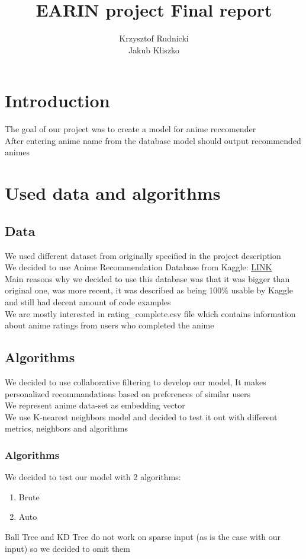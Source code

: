 \documentclass[12pt]{article}
\title{EARIN project Final report}
\author{Krzysztof Rudnicki \\ Jakub Kliszko}
\begin{document}
\maketitle
\section{Introduction}
The goal of our project was to create a model for anime reccomender \\ 
After entering anime name from the database model should output recommended animes 
\section{Used data and algorithms}
\subsection{Data}
We used different dataset from originally specified in the project description \\ 
We decided to use Anime Recommendation Database from Kaggle: \href{https://www.kaggle.com/datasets/hernan4444/anime-recommendation-database-2020}{LINK} \\ 
Main reasons why we decided to use this database was that it was bigger than original one, was more recent, it was described as being 100\% usable by Kaggle and still had decent amount of code examples \\ 
We are mostly interested in rating\_complete.csv file which contains information about anime ratings from users who completed the anime 
\subsection{Algorithms}
We decided to use collaborative filtering to develop our model, It makes personalized recommandations based on preferences of similar users \\ 
We represent anime data-set as embedding vector \\ 
We use K-nearest neighbors model and decided to test it out with different metrics, neighbors and algorithms \\ 
\subsubsection{Algorithms}
We decided to test our model with 2  algorithms:
\begin{enumerate}
  \item Brute
  \item Auto
\end{enumerate}
Ball Tree and KD Tree do not work on sparse input (as is the case with our input) so we decided to omit them
\end{document}
